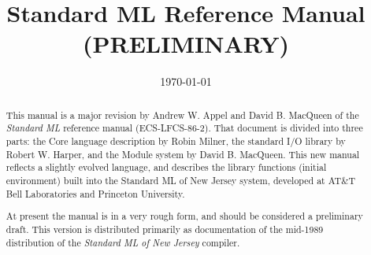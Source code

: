%
\title{Standard ML Reference Manual (PRELIMINARY)}
\author{}
\date{\today}



\newcommand{\xskip}{\vspace{1ex}}
\newcommand{\res}[1]{{\tt #1}}
\newcommand{\rep}[1]{\underline{\  {\footnotesize #1}  \ }}
\newcommand{\lhs}[1]{\pagebreak[1] \item[#1 \  \( \rightarrow \) ] }
\def\description{\list{}{\labelwidth 1.3in \labelsep 0.3in
                         \leftmargin 1.6in
 \let\makelabel\descriptionlabel}}
\maketitle
\begin{abstract}
This manual is a major revision by Andrew W. Appel and David B. MacQueen
of the {\em Standard ML} reference manual (ECS-LFCS-86-2).  That
document is divided into three parts: the Core language description
by Robin Milner, the standard I/O library by Robert W. Harper,
and the Module system by David B. MacQueen.  This new manual reflects
a slightly evolved language, and describes the library functions
(initial environment) built into the Standard ML of New Jersey system,
developed at AT\&T Bell Laboratories and Princeton University.

At present the manual is in a very rough form, and should be
considered a preliminary draft.  This version is distributed
primarily as documentation of the mid-1989 distribution of the
{\it Standard ML of New Jersey} compiler.
\end{abstract}













\appendix




